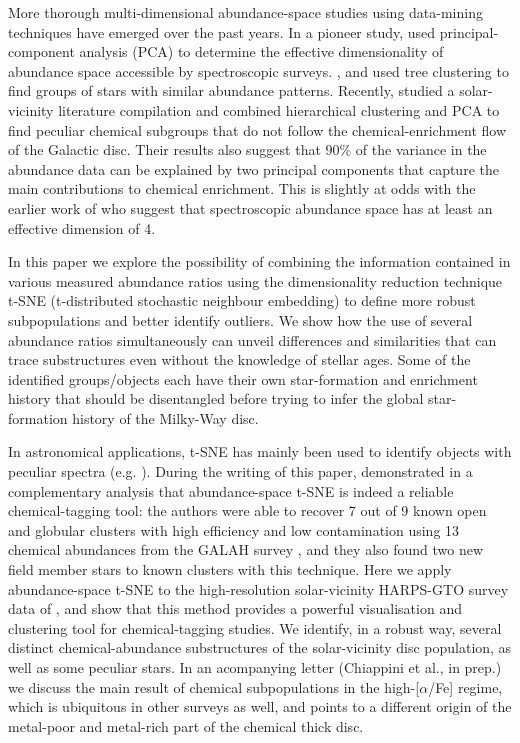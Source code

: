 \documentclass{aa}  %
\begin{document}
More thorough multi-dimensional abundance-space studies using data-mining techniques have emerged over the past years. In a pioneer study, \citet{Ting2012} used principal-component analysis (PCA) to determine the effective dimensionality of abundance space accessible by spectroscopic surveys. \citet{daSilva2012, daSilva2015}, and \citet{Jofre2017} used tree clustering to find groups of stars with similar abundance patterns. Recently, \citet{Boesso2018} studied a solar-vicinity literature compilation and combined hierarchical clustering and PCA to find peculiar chemical subgroups that do not follow the chemical-enrichment flow of the Galactic disc. Their results also suggest that 90\% of the variance in the abundance data can be explained by two principal components that capture the main contributions to chemical enrichment. This is slightly at odds with the earlier work of \citet{Ting2012} who suggest that spectroscopic abundance space has at least an effective dimension of 4.

In this paper we explore the possibility of combining the information contained in various measured abundance ratios using the dimensionality reduction technique t-SNE (t-distributed stochastic neighbour embedding) to define more robust subpopulations and better identify outliers. We show how the use of several abundance ratios simultaneously can unveil differences and similarities that can trace substructures even without the knowledge of stellar ages. Some of the identified groups/objects each have their own star-formation and enrichment history that should be disentangled before trying to infer the global star-formation history of the Milky-Way disc.

In astronomical applications, t-SNE has mainly been used to identify objects with peculiar spectra (e.g. \citealt{Matijevivc2017, Valentini2017, Traven2017, Reis2018}). 
During the writing of this paper, \citet{Kos2018} demonstrated in a complementary analysis that abundance-space t-SNE is indeed a reliable chemical-tagging tool: the authors were able to recover 7 out of 9 known open and globular clusters with high efficiency and low contamination using 13 chemical abundances from the GALAH survey \citep{Martell2017}, and they also found two new field member stars to known clusters with this technique. 
Here we apply abundance-space t-SNE to the high-resolution solar-vicinity HARPS-GTO survey data of \citet{DelgadoMena2017}, and show that this method provides a powerful visualisation and clustering tool for chemical-tagging studies. We identify, in a robust way, several distinct chemical-abundance substructures of the solar-vicinity disc population, as well as some peculiar stars. In an acompanying letter (Chiappini et al., in prep.) we discuss the main result of chemical subpopulations in the high-[$\alpha$/Fe] regime, which is ubiquitous in other surveys as well, and points to a different origin of the metal-poor and metal-rich part of the chemical thick disc. 
\end{document}
